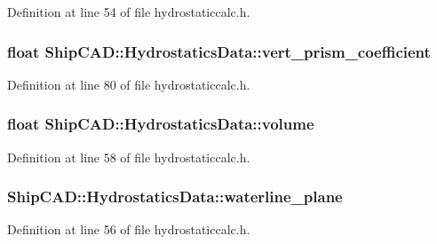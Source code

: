 Definition at line 54 of file hydrostaticcalc.\-h.

\hypertarget{structShipCAD_1_1HydrostaticsData_a2a7fc6a194bc1e78ecce8ab16512d1eb}{
\subsubsection[{vert\-\_\-prism\-\_\-coefficient}]{\setlength{\rightskip}{0pt plus 5cm}float Ship\-C\-A\-D\-::\-Hydrostatics\-Data\-::vert\-\_\-prism\-\_\-coefficient}}\label{structShipCAD_1_1HydrostaticsData_a2a7fc6a194bc1e78ecce8ab16512d1eb}


Definition at line 80 of file hydrostaticcalc.\-h.

\hypertarget{structShipCAD_1_1HydrostaticsData_acfbee81bded1b067a23cfc8cc9c00855}{
\subsubsection[{volume}]{\setlength{\rightskip}{0pt plus 5cm}float Ship\-C\-A\-D\-::\-Hydrostatics\-Data\-::volume}}\label{structShipCAD_1_1HydrostaticsData_acfbee81bded1b067a23cfc8cc9c00855}


Definition at line 58 of file hydrostaticcalc.\-h.

\hypertarget{structShipCAD_1_1HydrostaticsData_af93141f846f6622bb146cda042962303}{
\subsubsection[{waterline\-\_\-plane}]{ Ship\-C\-A\-D\-::\-Hydrostatics\-Data\-::waterline\-\_\-plane}}\label{structShipCAD_1_1HydrostaticsData_af93141f846f6622bb146cda042962303}


Definition at line 56 of file hydrostaticcalc.\-h.

